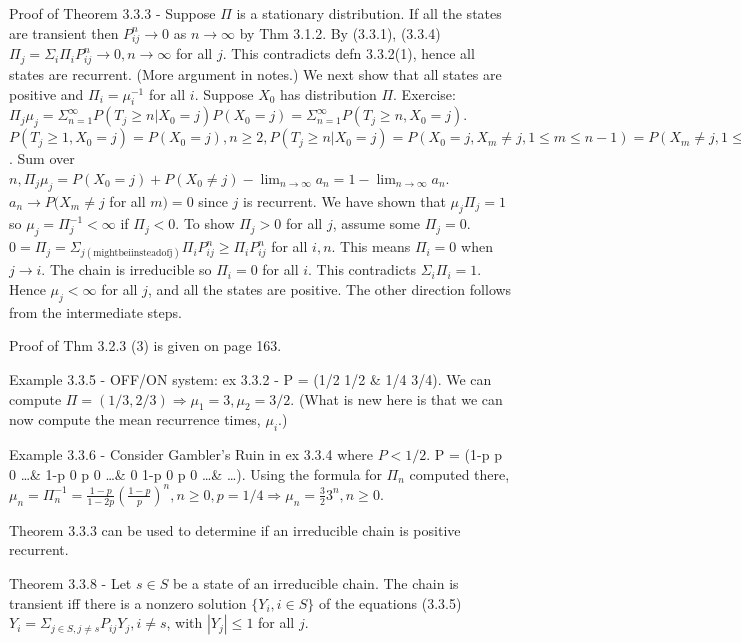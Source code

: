 \documentclass{article}
\begin{document}
Proof of Theorem 3.3.3 - Suppose $\Pi$ is a stationary distribution. If all the states are transient then $P_{ij}^n \rightarrow 0$ as $n \rightarrow \infty$ by Thm 3.1.2. By (3.3.1), (3.3.4) $\Pi_j = \Sigma_i \Pi_i P_{ij}^n \rightarrow 0, n \rightarrow \infty$ for all $j$. This contradicts defn 3.3.2(1), hence all states are recurrent. (More argument in notes.) We next show that all states are positive and $\Pi_i = \mu_i^{-1}$ for all $i$. Suppose $X_0$ has distribution $\Pi$.  Exercise: $\Pi_j \mu_j = \Sigma_{n=1}^\infty P(T_j \ge n | X_0=j) P(X_0=j) = \Sigma_{n=1}^\infty P(T_j \ge n, X_0=j)$. $P(T_j \ge 1, X_0=j) = P(X_0=j), n \ge 2, P(T_j \ge n | X_0=j) = P(X_0=j, X_m \ne j, 1 \le m \le n-1) = P(X_m \ne j, 1 \le m \le n-1) - P(X_m \ne j, 0 \le m \le n-1) = P(X_m \ne j, 0 \le m \le n-2) - P(X_m \ne j, 0 \le m \le n-1) = a_{n-2} - a_{n-1}, a_n = P(X_m \ne j, 0 \le m \le n)$. Sum over $n, \Pi_j \mu_j = P(X_0=j) + P(X_0 \ne j) - \lim_{n \rightarrow \infty} a_n = 1 - \lim_{n \rightarrow \infty} a_n$. $a_n \rightarrow P(X_m \ne j$ for all $m) = 0$ since $j$ is recurrent. We have shown that $\mu_j \Pi_j = 1$ so $\mu_j = \Pi_j^{-1} < \infty$ if $\Pi_j < 0$. To show $\Pi_j > 0$ for all $j$, assume some $\Pi_j=0$. $0 = \Pi_j = \Sigma_{j (\mathrm{might be i instead of j})} \Pi_i P_{ij}^n \ge \Pi_i P_{ij}^n$ for all $i, n$. This means $\Pi_i = 0$ when $j \rightarrow i$. The chain is irreducible so $\Pi_i = 0$ for all $i$. This contradicts $\Sigma_i \Pi_i = 1$. Hence $\mu_j < \infty$ for all $j$, and all the states are positive. The other direction follows from the intermediate steps.

Proof of Thm 3.2.3 (3) is given on page 163.

Example 3.3.5 - OFF/ON system: ex 3.3.2 - P = (1/2 1/2 \& 1/4 3/4). We can compute $\Pi = (1/3, 2/3) \Rightarrow \mu_1 = 3, \mu_2 = 3/2$. (What is new here is that we can now compute the mean recurrence times, $\mu_i$.)

Example 3.3.6 - Consider Gambler's Ruin in ex 3.3.4 where $P < 1/2$. P = (1-p p 0 \dots \& 1-p 0 p 0 \dots \& 0 1-p 0 p 0 \dots \& \dots). Using the formula for $\Pi_n$ computed there, $\mu_n = \Pi_n^{-1} = \frac{1-p}{1-2p} ( \frac{1-p}{p} )^n, n \ge 0, p = 1/4 \Rightarrow \mu_n = \frac{3}{2} 3^n, n \ge 0$.

Theorem 3.3.3 can be used to determine if an irreducible chain is positive recurrent.

Theorem 3.3.8 - Let $s \in S$ be a state of an irreducible chain. The chain is transient iff there is a nonzero solution $\{Y_i, i \in S\}$ of the equations (3.3.5) $Y_i = \Sigma_{j \in S, j \ne s} P_{ij} Y_j, i \ne s$, with $|Y_j| \le 1$ for all $j$.
\end{document}
